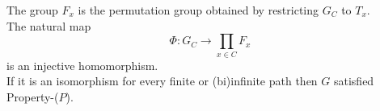 \documentclass[preview]{standalone}
\begin{document}
The group $F_{x}$ is the permutation group obtained by restricting $G_{C}$ to $T_{x}$.\\The natural map \[\Phi : G_{C} \to \prod_{x \in C} F_{x}\] is an injective homomorphism.\\If it is an isomorphism for every finite or (bi)infinite path then $G$ satisfied Property-($P$).\\
\end{document}
